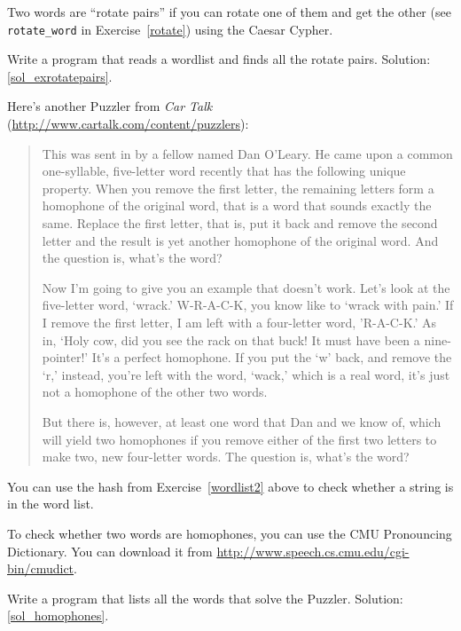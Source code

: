 \begin{exercise}
\label{exrotatepairs}

Two words are ``rotate pairs'' if you can rotate one of them
and get the other (see \verb"rotate_word" in Exercise~\ref{rotate}) using the Caesar Cypher.

Write a program that reads a wordlist and finds all the rotate
pairs.  
Solution: \ref{sol_exrotatepairs}.

\end{exercise}


\begin{exercise}
\label{homophones}

Here's another Puzzler from {\em Car Talk} 
(\url{http://www.cartalk.com/content/puzzlers}):

\begin{quote}
This was sent in by a fellow named Dan O'Leary. He came upon a common
one-syllable, five-letter word recently that has the following unique
property. When you remove the first letter, the remaining letters form
a homophone of the original word, that is a word that sounds exactly
the same. Replace the first letter, that is, put it back and remove
the second letter and the result is yet another homophone of the
original word. And the question is, what's the word?

Now I'm going to give you an example that doesn't work. Let's look at
the five-letter word, `wrack.' W-R-A-C-K, you know like to `wrack with
pain.' If I remove the first letter, I am left with a four-letter
word, 'R-A-C-K.' As in, `Holy cow, did you see the rack on that buck!
It must have been a nine-pointer!' It's a perfect homophone. If you
put the `w' back, and remove the `r,' instead, you're left with the
word, `wack,' which is a real word, it's just not a homophone of the
other two words.

But there is, however, at least one word that Dan and we know of,
which will yield two homophones if you remove either of the first two
letters to make two, new four-letter words. The question is, what's
the word?
\end{quote}

You can use the hash from Exercise~\ref{wordlist2} above to check
whether a string is in the word list.

To check whether two words are homophones, you can use the CMU
Pronouncing Dictionary.  You can download it from
\url{http://www.speech.cs.cmu.edu/cgi-bin/cmudict}.

Write a program that lists all the words that solve the Puzzler.
Solution: \ref{sol_homophones}.

\end{exercise}


